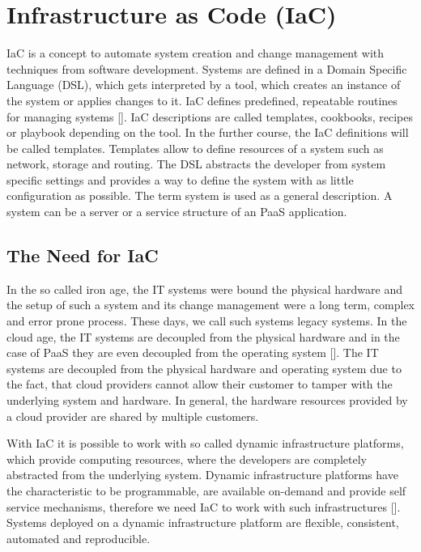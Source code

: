 \chapter{Infrastructure as Code (IaC)}
\label{cha:iac}
IaC is a concept to automate system creation and change management with techniques from software development. Systems are defined in a Domain Specific Language (DSL), which gets interpreted by a tool, which creates an instance of the system or applies changes to it. IaC defines predefined, repeatable routines for managing systems [\cite[p. 5]{Morris2016}]. IaC descriptions are called templates, cookbooks, recipes or playbook depending on the tool. In the further course, the IaC definitions will be called templates. Templates allow to define resources of a system such as network, storage and routing. The DSL abstracts the developer from system specific settings and provides a way to define the system with as little configuration as possible. The term system is used as a general description. A system can be a server or a service structure of an PaaS application.

\section{The Need for IaC}
\label{sec:iac-need}
In the so called iron age, the IT systems were bound the physical hardware and the setup of such a system and its change management were a long term, complex and error prone process. These days, we call such systems legacy systems. In the cloud age, the IT systems are decoupled from the physical hardware and in the case of PaaS they are even decoupled from the operating system [\cite[p. 4]{Morris2016}]. The IT systems are decoupled from the physical hardware and operating system due to the fact, that cloud providers cannot allow their customer to tamper with the underlying system and hardware. In general, the hardware resources provided by a cloud provider are shared by multiple customers. 

With IaC it is possible to work with so called dynamic infrastructure platforms, which provide computing resources, where the developers are completely abstracted from the underlying system. Dynamic infrastructure platforms have the characteristic to be programmable, are available on-demand and provide self service mechanisms, therefore we need IaC to work with such infrastructures  [\cite[p. 21-22]{Morris2016}]. Systems deployed on a dynamic infrastructure platform are flexible, consistent, automated and reproducible.

